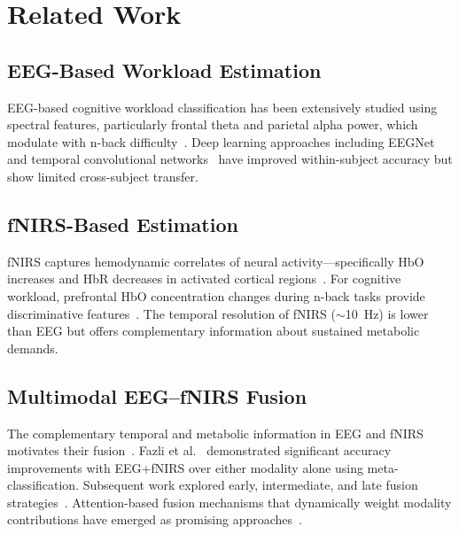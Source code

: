 \documentclass[conference]{IEEEtran}
\begin{document}
\section{Related Work}

\subsection{EEG-Based Workload Estimation}

EEG-based cognitive workload classification has been extensively studied using spectral features, particularly frontal theta and parietal alpha power, which modulate with n-back difficulty~\cite{gevins1998monitoring,brouwer2012estimating}. Deep learning approaches including EEGNet~\cite{lawhern2018eegnet} and temporal convolutional networks~\cite{zhang2019cascade} have improved within-subject accuracy but show limited cross-subject transfer.

\subsection{fNIRS-Based Estimation}

fNIRS captures hemodynamic correlates of neural activity---specifically HbO increases and HbR decreases in activated cortical regions~\cite{naseer2015fnirs}. For cognitive workload, prefrontal HbO concentration changes during n-back tasks provide discriminative features~\cite{herff2014mental,aghajani2017measuring}. The temporal resolution of fNIRS ($\sim$10~Hz) is lower than EEG but offers complementary information about sustained metabolic demands.

\subsection{Multimodal EEG--fNIRS Fusion}

The complementary temporal and metabolic information in EEG and fNIRS motivates their fusion~\cite{fazli2012enhanced,khan2014decoding}. Fazli et al.~\cite{fazli2012enhanced} demonstrated significant accuracy improvements with EEG+fNIRS over either modality alone using meta-classification. Subsequent work explored early, intermediate, and late fusion strategies~\cite{hong2018hybrid,shin2018simultaneous}. Attention-based fusion mechanisms that dynamically weight modality contributions have emerged as promising approaches~\cite{ma2022attention}.
\end{document}
